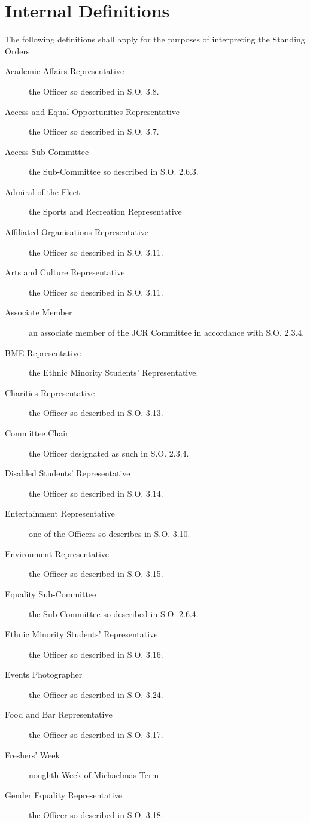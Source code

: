 \chapter{Internal Definitions}

\appnpara The following definitions shall apply for the purposes of interpreting the Standing Orders.
\begin{description}
\item[Academic Affairs Representative] the Officer so described in S.O. 3.8.
\item[Access and Equal Opportunities Representative] the Officer so described in S.O. 3.7.
\item[Access Sub-Committee] the Sub-Committee so described in S.O. 2.6.3.
\item[Admiral of the Fleet] the Sports and Recreation Representative
\item[Affiliated Organisations Representative] the Officer so described in S.O. 3.11.
\item[Arts and Culture Representative] the Officer so described in S.O. 3.11.
\item[Associate Member] an associate member of the JCR Committee in accordance with S.O. 2.3.4.
\item[BME Representative] the Ethnic Minority Students’ Representative.
\item[Charities Representative] the Officer so described in S.O. 3.13.
\item[Committee Chair] the Officer designated as such in S.O. 2.3.4.
\item[Disabled Students’ Representative] the Officer so described in S.O. 3.14.
\item[Entertainment Representative] one of the Officers so describes in S.O. 3.10.
\item[Environment Representative] the Officer so described in S.O. 3.15.
\item[Equality Sub-Committee] the Sub-Committee so described in S.O. 2.6.4.
\item[Ethnic Minority Students' Representative] the Officer so described in S.O. 3.16.
\item[Events Photographer] the Officer so described in S.O. 3.24.
\item[Food and Bar Representative] the Officer so described in S.O. 3.17.
\item[Freshers' Week] noughth Week of Michaelmas Term
\item[Gender Equality Representative] the Officer so described in S.O. 3.18.

\end{description}

